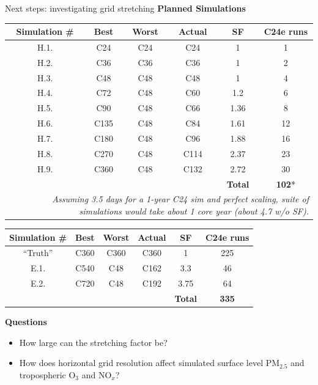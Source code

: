 \documentclass[10pt]{beamer}
\begin{document}
\begin{frame}{Next steps: investigating grid stretching}
    \vspace{0.4cm}
    \footnotesize
    \textbf{Planned Simulations}
    \tiny
    \begin{table}[]
    \begin{tabular}{cccccc}
        \hline
        \textbf{Simulation \#} & \textbf{Best} & \textbf{Worst} &  \textbf{Actual} & \textbf{SF} & \textbf{C24e runs} \\ 
        \hline
        H.1. & C24 & C24 & C24 & 1 & 1  \\ 
        H.2. & C36 & C36 & C36 & 1 & 2  \\ 
        H.3. & C48 & C48 & C48 & 1 & 4  \\ 
        H.4. & C72 & C48 & C60 & 1.2 & 6  \\ 
        H.5. & C90 & C48 & C66 & 1.36 & 8  \\ 
        H.6. & C135 & C48 & C84 & 1.61 & 12  \\ 
        H.7. & C180 & C48 & C96 & 1.88 & 16  \\ 
        H.8. & C270 & C48 & C114 & 2.37 & 23  \\ 
        H.9. & C360 & C48 & C132 & 2.72 & 30  \\ 
        \hline
         &  &  & & \textbf{Total} & \textbf{102}*  \\ 
         \multicolumn{6}{r}{\fontsize{3}{3}\selectfont\textit{Assuming 3.5 days for a 1-year C24 sim and perfect scaling, suite of simulations would take about 1 core year (about 4.7 w/o SF).}} \\
    \end{tabular}
    \end{table}
    
    \tiny
    \begin{table}[]
    \begin{tabular}{cccccc}
        \hline
        \textbf{Simulation \#} & \textbf{Best} & \textbf{Worst} &  \textbf{Actual} & \textbf{SF} & \textbf{C24e runs} \\ 
        \hline
        ``Truth'' & C360 & C360 & C360 & 1 & 225  \\ 
        E.1. & C540 & C48 & C162 & 3.3 & 46  \\ 
        E.2. & C720 & C48 & C192 & 3.75 & 64  \\ 
        \hline
         &  &  & & \textbf{Total} & \textbf{335}  \\ 
    \end{tabular}
    \end{table}
    
    \footnotesize
    \textbf{Questions}
    \begin{itemize}
        \item How large can the stretching factor be?
        \item How does horizontal grid resolution affect simulated surface level PM$_{2.5}$ and tropospheric O$_3$ and NO$_x$?
    \end{itemize}
\end{frame}
\end{document}
